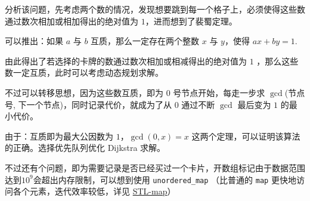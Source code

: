 分析该问题，先考虑两个数的情况，发现想要跳到每一个格子上，必须使得这些数通过数次相加或相加得出的绝对值为 $1$，进而想到了裴蜀定理。

可以推出：如果 $a$ 与 $b$ 互质，那么一定存在两个整数 $x$ 与 $y$，使得 $ax+by=1$.

由此得出了若选择的卡牌的数通过数次相加或相减得出的绝对值为 $1$ ，那么这些数一定互质，此时可以考虑动态规划求解。

不过可以转移思想，因为这些数互质，即为 $0$ 号节点开始，每走一步求 $\gcd$(节点号, 下一个节点)，同时记录代价，就成为了从 $0$ 通过不断 $\gcd$ 最后变为 $1$ 的最小代价。

由于：互质即为最大公因数为 $1$，$\gcd(0,x)=x$ 这两个定理，可以证明该算法的正确。选择优先队列优化 Dijkstra 求解。

不过还有个问题，即为需要记录是否已经买过一个卡片，开数组标记由于数据范围达到$10^9$会超出内存限制，可以想到使用 \texttt{unordered_map} （比普通的 \texttt{map} 更快地访问各个元素，迭代效率较低，详见 \href{/ds/stl/map/}{STL-map}）
